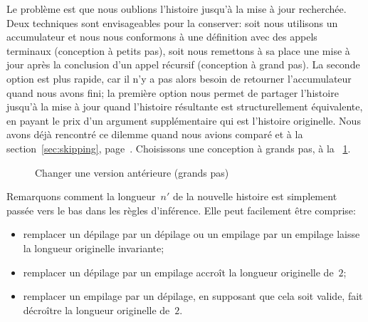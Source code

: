 Le problème est que nous oublions l'histoire jusqu'à la mise à jour
recherchée. Deux techniques sont envisageables pour la conserver: soit
nous utilisons un accumulateur
et nous nous conformons à une définition avec des appels
terminaux (conception à
petits pas), soit nous remettons à sa
place une mise à jour après la conclusion d'un appel récursif
(conception à grand pas). La seconde
option est plus rapide, car il n'y a pas alors besoin de retourner
l'accumulateur quand nous avons fini; la première option nous permet
de partager l'histoire jusqu'à la mise à jour quand l'histoire
résultante est structurellement équivalente, en payant le prix d'un
argument supplémentaire qui est l'histoire originelle. Nous avons déjà
rencontré ce dilemme quand nous avions comparé
 et
 à la
section~\ref{sec:skipping}, page~\pageref{sec:skipping}. Choisissons
une conception à grands pas, à la \fig~\ref{fig:chg}.
\begin{figure}[b]
\centering
{}
\caption{Changer une version antérieure (grands pas)}
\label{fig:chg}
\end{figure}
Remarquons comment la longueur~\(n'\) de la nouvelle histoire est
simplement passée vers le bas dans les règles d'inférence. Elle peut
facilement être comprise:
\begin{itemize}

  \item remplacer un dépilage par un dépilage ou un empilage par un
    empilage laisse la longueur originelle invariante;

  \item remplacer un dépilage par un empilage accroît la longueur
    originelle de~\(2\);

  \item remplacer un empilage par un dépilage, en supposant que cela
    soit valide, fait décroître la longueur originelle de~\(2\).

\end{itemize}
